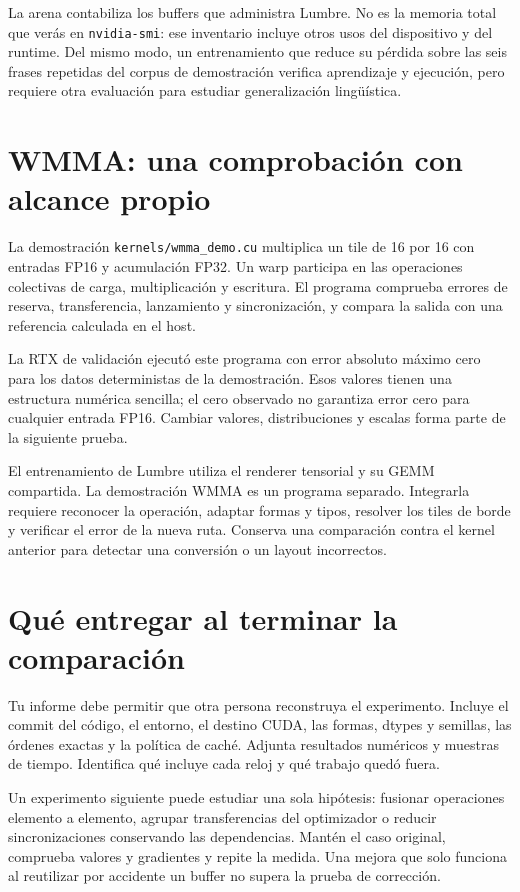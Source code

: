 \documentclass[12pt,a4paper,oneside]{report}
\begin{document}
La arena contabiliza los buffers que administra Lumbre. No es la memoria total que verás en \texttt{nvidia-smi}: ese inventario incluye otros usos del dispositivo y del runtime. Del mismo modo, un entrenamiento que reduce su pérdida sobre las seis frases repetidas del corpus de demostración verifica aprendizaje y ejecución, pero requiere otra evaluación para estudiar generalización lingüística.

\section{WMMA: una comprobación con alcance propio}
La demostración \texttt{kernels/wmma\_demo.cu} multiplica un tile de 16 por 16 con entradas FP16 y acumulación FP32. Un warp participa en las operaciones colectivas de carga, multiplicación y escritura. El programa comprueba errores de reserva, transferencia, lanzamiento y sincronización, y compara la salida con una referencia calculada en el host.

La RTX de validación ejecutó este programa con error absoluto máximo cero para los datos deterministas de la demostración. Esos valores tienen una estructura numérica sencilla; el cero observado no garantiza error cero para cualquier entrada FP16. Cambiar valores, distribuciones y escalas forma parte de la siguiente prueba.

El entrenamiento de Lumbre utiliza el renderer tensorial y su GEMM compartida. La demostración WMMA es un programa separado. Integrarla requiere reconocer la operación, adaptar formas y tipos, resolver los tiles de borde y verificar el error de la nueva ruta. Conserva una comparación contra el kernel anterior para detectar una conversión o un layout incorrectos.

\section{Qué entregar al terminar la comparación}
Tu informe debe permitir que otra persona reconstruya el experimento. Incluye el commit del código, el entorno, el destino CUDA, las formas, dtypes y semillas, las órdenes exactas y la política de caché. Adjunta resultados numéricos y muestras de tiempo. Identifica qué incluye cada reloj y qué trabajo quedó fuera.

Un experimento siguiente puede estudiar una sola hipótesis: fusionar operaciones elemento a elemento, agrupar transferencias del optimizador o reducir sincronizaciones conservando las dependencias. Mantén el caso original, comprueba valores y gradientes y repite la medida. Una mejora que solo funciona al reutilizar por accidente un buffer no supera la prueba de corrección.
\end{document}
